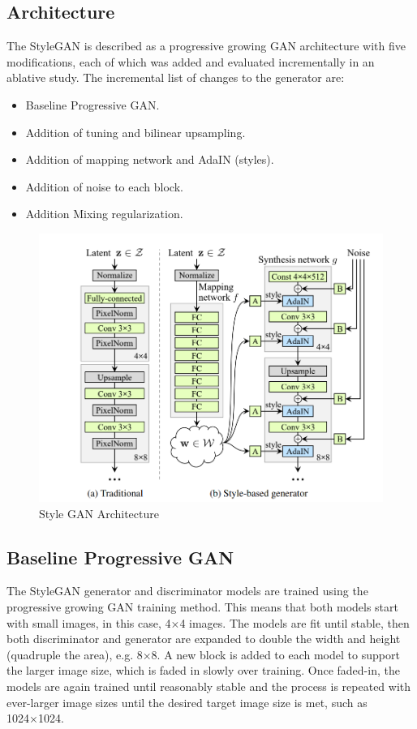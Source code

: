 \begin{onehalfspace}
\section{Architecture}
The StyleGAN is described as a progressive growing GAN architecture with five modifications, each of which was added and evaluated incrementally in an ablative study.
The incremental list of changes to the generator are:
    \begin{itemize}
        \item Baseline Progressive GAN.
        \item Addition of tuning and bilinear upsampling.
        \item Addition of mapping network and AdaIN (styles).
        \item Addition of noise to each block.
        \item Addition Mixing regularization.
    \end{itemize}
    \begin{figure}[h]
        \centering
        \includegraphics[width=0.8\linewidth]{styleganarchitecture.png}
        \caption{Style GAN Architecture}
    \end{figure} 
    \subsection{Baseline Progressive GAN}
    The StyleGAN generator and discriminator models are trained using the progressive growing GAN training method. This means that both models start with small images, in this case, 4×4 images. The models are fit until stable, then both discriminator and generator are expanded to double the width and height (quadruple the area), e.g. 8×8. A new block is added to each model to support the larger image size, which is faded in slowly over training. Once faded-in, the models are again trained until reasonably stable and the process is repeated with ever-larger image sizes until the desired target image size is met, such as 1024×1024.
    

\end{onehalfspace}

